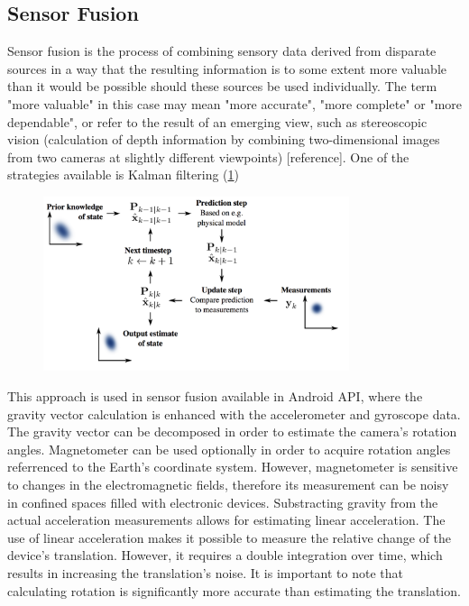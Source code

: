 \subsection{Sensor Fusion}
Sensor fusion is the process of combining sensory data derived from disparate
sources in a way that the resulting information is to some extent more valuable than it would be possible should these sources be used individually. The term "more valuable" in this case may mean "more
accurate", "more complete" or "more dependable", or refer to the result of an emerging view, such
as stereoscopic vision (calculation of depth information by combining two-dimensional
images from two cameras at slightly different viewpoints) [reference]. One of the strategies available is Kalman filtering (\ref{fig:Kalmann})
\begin{figure}[p]
    \centering
    \includegraphics[width=0.8\textwidth]{Kalmann}
    \caption{}
    \label{fig:Kalmann}
\end{figure}
This approach is used in sensor fusion available in Android API, where the gravity vector calculation is enhanced with the accelerometer and gyroscope data. The gravity vector can be decomposed in order to estimate the camera's rotation angles. Magnetometer can be used optionally in order to acquire rotation angles referrenced to the Earth's coordinate system. However, magnetometer is sensitive to changes in the electromagnetic fields, therefore its measurement can be noisy in confined spaces filled with electronic devices. Substracting gravity from the actual acceleration measurements allows for estimating linear acceleration. The use of linear acceleration makes it possible to measure the relative change of the device's translation. However, it requires a double integration over time, which results in increasing the translation's noise. It is important to note that calculating rotation is significantly more accurate than estimating the translation. 


